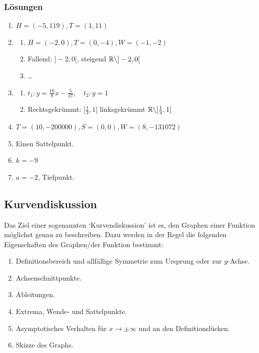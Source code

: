 \subsubsection*{Lösungen}
\begin{enumerate}
    \item $H=(-5, 119), T=(1,11)$
    \item \begin{enumerate}
              \item $H=(-2, 0), T=(0, -4), W=(-1, -2)$
              \item Fallend: $]-2, 0[$, steigend $\mathbb{R} \setminus ]-2, 0[$
              \item \dots
          \end{enumerate}
    \item \begin{enumerate}
              \item $t_1: y= \frac{16}{9}x -\frac{5}{27}, \quad t_2: y=1$
              \item Rechtsgekrümmt: $]\frac{1}{3}, 1[$ linksgekrümmt $\mathbb{R} \setminus ]\frac{1}{3}, 1[$
          \end{enumerate}

    \item $T=(10, -200000), S =(0,0), W=(8, -131072)$
    \item Einen Sattelpunkt.
    \item $k= -9$
    \item $a=-2$, Tiefpunkt.

\end{enumerate}
\clearpage

\subsection{Kurvendiskussion}
Das Ziel einer sogenannten `Kurvendiskussion' ist es, den Graphen einer Funktion möglichst genau zu beschreiben. Dazu werden in der Regel die folgenden Eigenschaften des Graphen/der Funktion bestimmt:
\begin{enumerate}
    \item Definitionsbereich und allfällige Symmetrie zum Ursprung oder zur $y$-Achse.
    \item Achsenschnittpunkte.
    \item Ableitungen.
    \item Extrema, Wende- und Sattelpunkte.
    \item Asymptotisches Verhalten für $x\to\pm\infty$ und an den Definitionslücken.
    \item Skizze des Graphs.
\end{enumerate}

